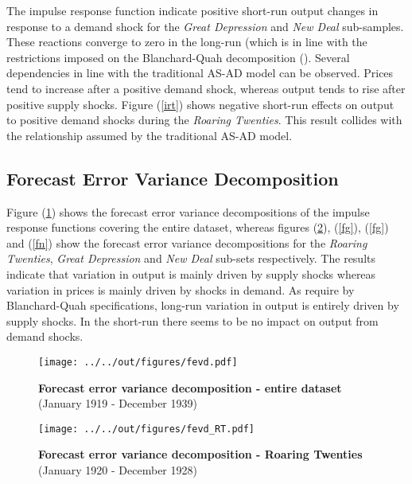 The impulse response function indicate positive short-run output changes in response to a demand shock for the \textit{Great Depression} and \textit{New Deal} sub-samples. These reactions converge to zero in the long-run (which is in line with the restrictions imposed on the Blanchard-Quah decomposition (\cite{blanchard}). Several dependencies in line with the traditional AS-AD model can be observed. Prices tend to increase after a positive demand shock, whereas output tends to rise after positive supply shocks. Figure (\ref{irt}) shows negative short-run effects on output to positive demand shocks during the \textit{Roaring Twenties}. This result collides with the relationship assumed by the traditional AS-AD model.

\clearpage
\subsection{Forecast Error Variance Decomposition}
Figure (\ref{ft}) shows the forecast error variance decompositions of the impulse response functions covering the entire dataset, whereas figures (\ref{fr}), (\ref{fg}), (\ref{fg}) and (\ref{fn}) show the forecast error variance decompositions for the \textit{Roaring Twenties}, \textit{Great Depression} and \textit{New Deal} sub-sets respectively. The results indicate that variation in output is mainly driven by supply shocks whereas variation in prices is mainly driven by shocks in demand. As require by Blanchard-Quah specifications, long-run variation in output is entirely driven by supply shocks. In the short-run there seems to be no impact on output from demand shocks.

\begin{figure}[ht]
  \footnotesize 
  \centering
  		\texttt{[image: ../../out/figures/fevd.pdf]}
  \vspace{3mm}
  \caption[Forecast error variance decomposition - Full data]{\textbf{Forecast error variance decomposition - entire dataset} (January 1919 - December 1939)}
  \label{ft}
\end{figure}

\begin{figure}[ht]
  \footnotesize 
  \centering
  		\texttt{[image: ../../out/figures/fevd\_RT.pdf]}
  \vspace{3mm}
  \caption[Forecast error variance decomposition - Roaring Twenties]{\textbf{Forecast error variance decomposition - Roaring Twenties} (January 1920 - December 1928)}
  \label{fr}
\end{figure}

